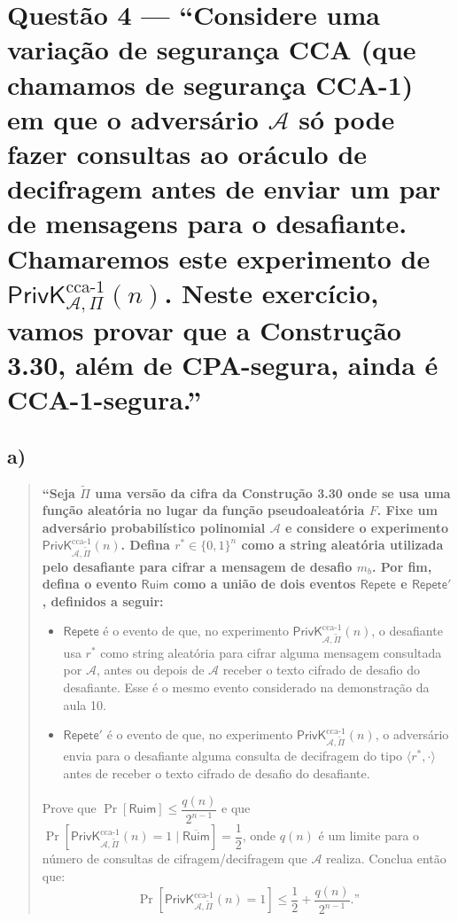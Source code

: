 \documentclass[11pt,a4paper]{article}
\newcommand{\Ruim}{\mathsf{Ruim}}
\newcommand{\Repete}{\mathsf{Repete}}
\newcommand{\PrivKccaI}[3]{\mathsf{PrivK}^{\mathrm{cca}\text{-}1}_{#1,#2}(#3)}
\begin{document}
    \section*{Questão 4 --- ``Considere uma variação de segurança CCA (que chamamos de
    segurança CCA-1) em que o adversário $\mathcal{A}$ só pode fazer consultas ao
    oráculo de decifragem antes de enviar um par de mensagens para o desafiante.
    Chamaremos este experimento de $\PrivKccaI{\mathcal{A}}{\Pi}{n}$. Neste exercício,
        vamos provar que a Construção 3.30, além de CPA-segura, ainda é CCA-1-segura.''}

    \subsection*{a)}

    \begin{quote}\small\bfseries
        ``Seja $\tilde{\Pi}$ uma versão da cifra da Construção 3.30 onde se usa uma função
        aleatória no lugar da função pseudoaleatória $F$. Fixe um adversário probabilístico
        polinomial $\mathcal{A}$ e considere o experimento
        $\PrivKccaI{\mathcal{A}}{\tilde{\Pi}}{n}$. Defina $r^{*} \in \{0,1\}^{n}$ como a
        string aleatória utilizada pelo desafiante para cifrar a mensagem de desafio $m_b$.
        Por fim, defina o evento $\Ruim$ como a união de dois eventos $\Repete$ e
        $\Repete'$, definidos a seguir:

        \begin{itemize}
            \item $\Repete$ é o evento de que, no experimento
            $\PrivKccaI{\mathcal{A}}{\tilde{\Pi}}{n}$, o desafiante usa $r^{*}$ como string
            aleatória para cifrar alguma mensagem consultada por $\mathcal{A}$, antes ou
            depois de $\mathcal{A}$ receber o texto cifrado de desafio do desafiante. Esse é
            o mesmo evento considerado na demonstração da aula 10.
            \item $\Repete'$ é o evento de que, no experimento
            $\PrivKccaI{\mathcal{A}}{\tilde{\Pi}}{n}$, o adversário envia para o desafiante
            alguma consulta de decifragem do tipo $\langle r^{*}, \cdot \rangle$ antes de
            receber o texto cifrado de desafio do desafiante.
        \end{itemize}

        Prove que $\Pr[\Ruim] \le \dfrac{q(n)}{2^{n-1}}$ e que
        $\Pr\!\left[\PrivKccaI{\mathcal{A}}{\tilde{\Pi}}{n} = 1 \mid \overline{\Ruim}\right]
        = \dfrac{1}{2}$, onde $q(n)$ é um limite para o número de consultas de
        cifragem/decifragem que $\mathcal{A}$ realiza.
        Conclua então que:
        \[
            \Pr\!\left[\PrivKccaI{\mathcal{A}}{\tilde{\Pi}}{n} = 1\right]
            \le \frac{1}{2} + \frac{q(n)}{2^{n-1}}.\text{''}
        \]
    \end{quote}
\end{document}
